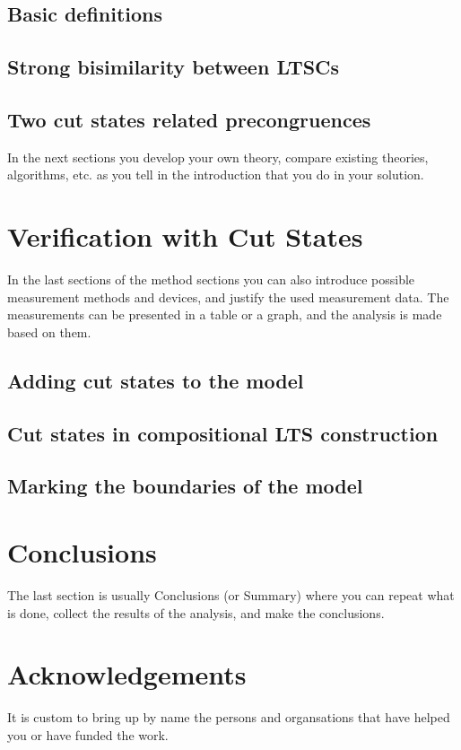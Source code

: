 \documentclass[a4paper,12pt]{article}
\begin{document}
\subsection{Basic definitions}

\subsection{Strong bisimilarity between LTSCs}

\subsection{Two cut states related precongruences}
In the next sections you develop your own theory, compare existing theories, algorithms, etc. as you tell in the introduction that you do in your solution. 
\section{Verification with Cut States}
In the last sections of the method sections you can also introduce possible measurement methods and devices, and justify the used measurement data. The measurements can be presented in a table or a graph, and the analysis is made based on them.


\subsection{Adding cut states to the model}

\subsection{Cut states in compositional LTS construction}

\subsection{Marking the boundaries of the model}

\section{Conclusions}
The last section is usually Conclusions (or Summary) where you can repeat what is done, collect the results of the analysis, and make the conclusions.
 
\section*{Acknowledgements}
It is custom to bring up by name the persons and organsations that have helped you or have funded the work.
\end{document}

